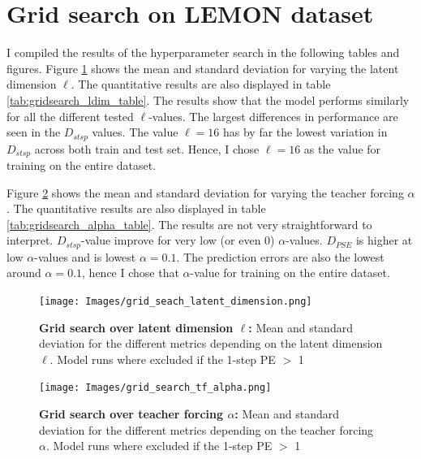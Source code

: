 

\FloatBarrier
\section{Grid search on LEMON dataset} \label{sec:results_gridsearch} 

I compiled the results of the hyperparameter search in the following tables and figures. Figure \ref{fig:grid_seach_latent_dimension} shows the mean and standard deviation
for varying the latent dimension $\ell$. The quantitative results are also displayed in table \ref{tab:gridsearch_ldim_table}. The results show that the model performs similarly 
for all the different tested $\ell$-values. The largest differences in performance are seen in the $D_{stsp}$ values. The value $\ell = 16$ has by far the lowest variation in 
$D_{stsp}$ across both train and test set. Hence, I chose $\ell=16$ as the value for training on the entire dataset.

Figure \ref{fig:grid_search_tf_alpha} shows the mean and standard deviation
for varying the teacher forcing $\alpha$. The quantitative results are also displayed in table \ref{tab:gridsearch_alpha_table}. The results are not very straightforward to
interpret. $D_{stsp}$-value improve for very low (or even 0) $\alpha$-values. $D_{PSE}$ is higher at low $\alpha$-values and is lowest $\alpha = 0.1$. The prediction errors 
are also the lowest around $\alpha=0.1$, hence I chose that $\alpha$-value for training on the entire dataset.



\begin{figure}
    \texttt{[image: Images/grid\_seach\_latent\_dimension.png]}
    \caption[Grid search over latent dimension $ \ell $]
    {\textbf{Grid search over latent dimension $ \ell $: } Mean and standard deviation for the different metrics depending on the latent dimension $\ell$. Model runs 
    where excluded if the 1-step PE $>$ 1}
    \label{fig:grid_seach_latent_dimension}
\end{figure}



\begin{figure}
    \texttt{[image: Images/grid\_search\_tf\_alpha.png]}
    \caption[Grid search over teacher forcing $\alpha$]
    {\textbf{Grid search over teacher forcing $\alpha$: } Mean and standard deviation for the different metrics depending on the teacher forcing $\alpha$. Model runs 
    where excluded if the 1-step PE $>$ 1}
    \label{fig:grid_search_tf_alpha}
\end{figure}


